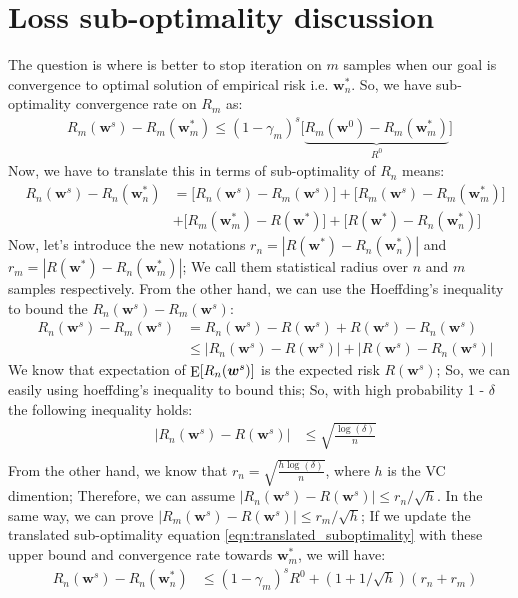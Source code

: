 \documentclass[11pt, a4paper, reqno, twoside]{scrartcl}
\theoremstyle{style}
\DeclareMathOperator*{\E}{\rm E}
\newcommand{\wv}{\bm{w}}
\newcommand{\0}{\mathbf{0}} %
\begin{document}
\section{Loss sub-optimality discussion}
 The question is where is better to stop iteration on $m$
samples when our goal is convergence to optimal solution of empirical risk i.e.
$\wv_n^*$. So, we have sub-optimality convergence rate on $R_m$ as: 
 \begin{eqnarray*}
 	  R_m(\wv^s) - R_m(\wv^*_m) \leq  (1-\gamma_m)^s\bigg[
 	  \underbrace{R_m(\wv^0) - R_m(\wv^*_m)}_{R^0} \bigg]
  \end{eqnarray*}
Now, we have to translate this in terms of sub-optimality of $R_n$ means: 
\begin{eqnarray}
	& R_n(\wv^s) - R_n(\wv^*_n) & = \bigg[R_n(\wv^s) - R_m(\wv^s) \bigg] +
	\bigg[ R_m(\wv^s) - R_m(\wv^*_m)\bigg] \nonumber  \\ 
	& & + \bigg[ R_m(\wv^*_m) - R(\wv^*)\bigg] + \bigg[ R(\wv^*) -
	R_n(\wv^*_n)\bigg] \label{eqn:translated_suboptimality}
\end{eqnarray}
Now, let's introduce the new notations $r_n = |R(\wv^*) -
	R_n(\wv^*_n)|$ and $r_m = |R(\wv^*) -
	R_n(\wv^*_m)|$; We call them statistical radius over $n$ and $m$ samples
	respectively. From the other hand, we can use the Hoeffding's inequality to
	bound the $R_n(\wv^s) - R_m(\wv^s)$: 
	\begin{eqnarray}
	& R_n(\wv^s) - R_m(\wv^s) & =  R_n(\wv^s) - R(\wv^s) + R(\wv^s) - R_n(\wv^s)
	\nonumber \\
	& & \leq |R_n(\wv^s) - R(\wv^s)| + |R(\wv^s) - R_n(\wv^s)| \nonumber
	\end{eqnarray}
	We know that expectation of $\E [ R_n(\wv^s)] $ is the expected risk
	$R(\wv^s)$; So, we can easily using hoeffding's inequality to bound this; So,
	with high probability 1 - $\delta$ the following inequality holds: 
	\begin{eqnarray*}
		& |R_n(\wv^s) - R(\wv^s)| & \leq \sqrt{\frac{\log(\delta)}{n}} \\ 
	\end{eqnarray*}
	From the other hand, we know that $r_n = \sqrt{\frac{h\log(\delta)}{n}}$, where
	$h$ is the VC dimention; Therefore, we can assume $|R_n(\wv^s) - R(\wv^s)| \leq
	r_n/\sqrt{h}$. In the same way, we can prove $|R_m(\wv^s) - R(\wv^s)| \leq
	r_m/\sqrt{h}$; If we update the translated sub-optimality equation
	\ref{eqn:translated_suboptimality} with these upper bound and convergence rate
	towards $\wv_m^*$, we will have:
	\begin{eqnarray*} 
		& R_n(\wv^s) - R_n(\wv^*_n) & \leq (1-\gamma_m)^s R^0 + (1+1/\sqrt{h})(r_n +
		r_m)
	\end{eqnarray*}
\end{document}
